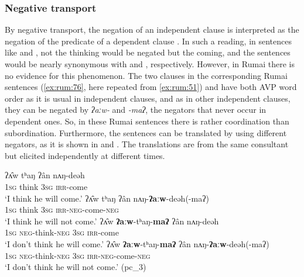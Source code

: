 \documentclass[output=paper,colorlinks,citecolor=brown]{langscibook}
\begin{document}
\subsubsection{Negative transport} \label{sec:rum:4.6.1}

By negative transport, the negation of an independent clause is interpreted as the negation of the predicate of a dependent clause \citep[223]{Miestamo2009}. 
In such a reading, in sentences like  and , not the thinking would be negated but the coming, and the sentences would be nearly synonymous with  and , respectively. However, in Rumai there is no evidence for this phenomenon. The two clauses in the corresponding Rumai sentences (\ref{ex:rum:76}, here repeated from \ref{ex:rum:51}) and  have both AVP word order as it is usual in independent clauses, and as in other independent clauses, they can be negated by \textit{ʔaːw-} and \textit{{}-maʔ}, the negators that never occur in dependent ones. So, in these Rumai sentences there is rather coordination than subordination. Furthermore, the sentences can be translated by using different negators, as it is shown in  and . The translations are from the same consultant but elicited independently at different times.

\ea\label{ex:rum:76}
    \ea\label{ex:rum:76a}
        \gll ʔʌ̂w	tʰaŋ	ʔân	nʌŋ-deəh \\ 
             1\textsc{sg} think 3\textsc{sg} \textsc{irr}{}-come \\
        \glt ‘I think he will come.’
    \ex\label{ex:rum:76b}
        \gll ʔʌ̂w	tʰaŋ	ʔân	nʌŋ-\textbf{ʔaːw}-deəh(-maʔ) \\
             1\textsc{sg} think 3\textsc{sg} \textsc{irr}{}-\textsc{neg}{}-come-\textsc{neg} \\
        \glt ‘I think he will not come.’
    \ex\label{ex:rum:76c}
        \gll ʔʌ̂w	\textbf{ʔaːw}-tʰaŋ-\textbf{maʔ}	ʔân	nʌŋ-deəh \\
             1\textsc{sg} \textsc{neg}{}-think-\textsc{neg} 3\textsc{sg} \textsc{irr}{}-come \\
        \glt ‘I don’t think he will come.’
    \ex\label{ex:rum:76d}
        \gll ʔʌ̂w	\textbf{ʔaːw}-tʰaŋ-\textbf{maʔ}	ʔân	nʌŋ-\textbf{ʔaːw}-deəh(-maʔ) \\
             1\textsc{sg} \textsc{neg}{}-think-\textsc{neg} 3\textsc{sg} \textsc{irr}{}-\textsc{neg}{}-come-\textsc{neg} \\
        \glt ‘I don’t think he will not come.’ (pc\_3)
    \z
\z 
\end{document}
